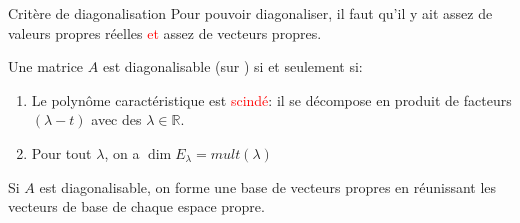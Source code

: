 \begin{parag}{Critère de diagonalisation}
    Pour pouvoir diagonaliser, il faut qu'il y ait assez de valeurs propres réelles \textcolor{red}{et} assez de vecteurs propres.
    \begin{theoreme}
        Une matrice $A$ est diagonalisable (sur \R) si et seulement si:
        \begin{enumerate}
            \item Le polynôme caractéristique est \textcolor{red}{scindé}: il se décompose en produit de facteurs $(\lambda - t)$ avec des $\lambda \in \mathbb{R}$.
            \item Pour tout $\lambda$, on a $\dim E_\lambda = mult(\lambda)$
        \end{enumerate}
        Si $A$ est diagonalisable, on forme une base de vecteurs propres en réunissant les vecteurs de base de chaque espace propre.
        

\end{theoreme}
\end{parag}
